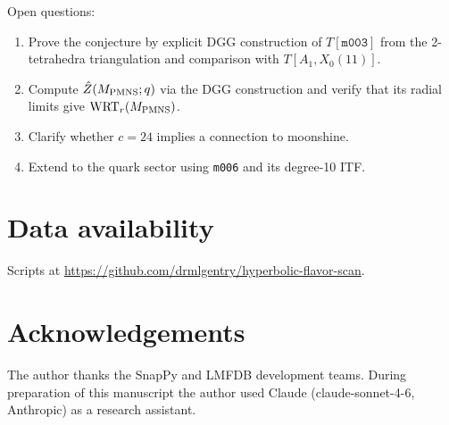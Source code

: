\documentclass[11pt,a4paper]{article}
\theoremstyle{remark}
\newcommand{\mfld}[1]{\texttt{#1}}
\begin{document}
Open questions:
\begin{enumerate}
\item Prove the conjecture by explicit DGG construction of $T[\mfld{m003}]$
  from the 2-tetrahedra triangulation and comparison with $T[A_1,X_0(11)]$.
\item Compute $\hat{Z}(M_{\rm PMNS};q)$ via the DGG construction and
  verify that its radial limits give $\mathrm{WRT}_r(M_{\rm PMNS})$.
\item Clarify whether $c=24$ implies a connection to moonshine.
\item Extend to the quark sector using \mfld{m006} and its degree-10 ITF.
\end{enumerate}

\section*{Data availability}
Scripts at \url{https://github.com/drmlgentry/hyperbolic-flavor-scan}.

\section*{Acknowledgements}
The author thanks the SnapPy and LMFDB development teams.
During preparation of this manuscript the author used Claude
(claude-sonnet-4-6, Anthropic) as a research assistant.
\end{document}

